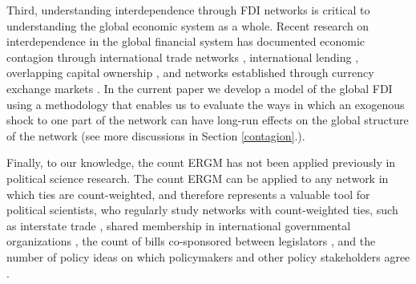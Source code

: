 \documentclass[reqno,onecolumn,letterpaper,12pt]{article}
\begin{document}
Third, understanding interdependence through FDI networks is critical to understanding the global economic system as a whole.  Recent research on interdependence in the global financial system has documented economic contagion through international trade networks \citep{kali2010financial,schiavo2010international},  international lending \citep{gai2010contagion,zakaria2017evidence}, overlapping capital ownership \citep{chuluun2017global}, and networks established through currency exchange markets \citep{brida2009symbolic,matesanz2014network}. %
In the current paper we develop a model of the global FDI using a methodology that enables us to evaluate the ways in which an exogenous shock to one part of the network can have long-run effects on the global structure of the network (see more discussions in Section \ref{contagion}.).

Finally, to our knowledge, the count ERGM has not been applied previously in political science research. The count ERGM can be applied to any network in which ties are count-weighted, and therefore represents a valuable tool for political scientists, who regularly study networks with count-weighted ties, such as interstate trade \citep{ward2007persistent}, shared membership in international governmental organizations \citep{boehmke2016addressing}, the count of bills co-sponsored between legislators \citep{kirkland2013hypothesis}, and the number of policy ideas on which policymakers and other policy stakeholders agree \citep{leifeld2013reconceptualizing}.


\end{document}
